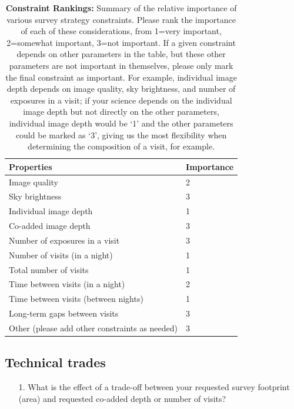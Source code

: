 \documentclass[12pt,letterpaper]{article}
\begin{document}
\begin{table}[ht]
    \centering
    \begin{tabular}{l|l}
        \toprule
        Properties & Importance \hspace{.3in} \\
        \midrule
        Image quality &  2 \\
        Sky brightness &  3 \\
        Individual image depth & 1  \\
        Co-added image depth &  3 \\
        Number of exposures in a visit   &  3 \\
        Number of visits (in a night)  &  1 \\ 
        Total number of visits &  1 \\
        Time between visits (in a night) & 2 \\
        Time between visits (between nights)  &  1 \\
        Long-term gaps between visits & 3 \\
        Other (please add other constraints as needed) & 3 \\
        \bottomrule
    \end{tabular}
     \caption{{\bf Constraint Rankings:} Summary of the relative importance of various survey strategy constraints. Please rank the importance of each of these considerations, from 1=very important, 2=somewhat important, 3=not important. If a given constraint depends on other parameters in the table, but these other parameters are not important in themselves, please only mark the final constraint as important. For example, individual image depth depends on image quality, sky brightness, and number of exposures in a visit; if your science depends on the individual image depth but not directly on the other parameters, individual image depth would be `1' and the other parameters could be marked as `3', giving us the most flexibility when determining the composition of a visit, for example.}
         \label{tab:obs_constraints}
\end{table}

\subsection{Technical trades}
\begin{footnotesize}
\begin{enumerate}
    \item[1.] What is the effect of a trade-off between your requested survey footprint (area) and requested co-added depth or number of visits?
\end{enumerate}
\end{footnotesize}
\end{document}
